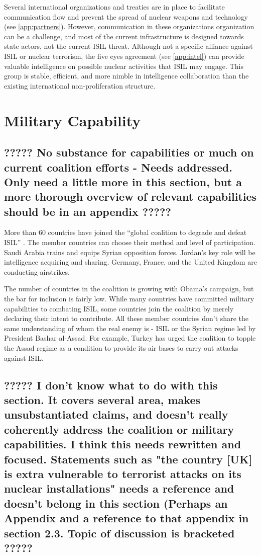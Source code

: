 \documentclass{report}
\begin{document}
Several international organizations and treaties are in place to facilitate communication flow and prevent the spread of nuclear weapons and technology (see \autoref{app:partners}).  However, communication in these organizations organization can be a challenge, and most of the current infrastructure is designed towards state actors, not the current ISIL threat.  Although not a specific alliance against ISIL or nuclear terrorism, the five eyes agreement (see \autoref{app:intel}) can provide valuable intelligence on possible nuclear activities that ISIL may engage. This group is stable, efficient, and more nimble in intelligence collaboration than the existing international non-proliferation structure.  

\section{Military Capability}

\subsection{????? No substance for capabilities or much on current coalition efforts - Needs addressed.  Only need a little more in this section, but a more thorough overview of relevant capabilities should be in an appendix ?????}



More than 60 countries have joined the \enquote{global coalition to degrade and defeat ISIL} \cite{Drennan2014}. The member countries can choose their method and level of participation. Saudi Arabia trains and equips Syrian opposition forces. Jordan's key role will be intelligence acquiring and sharing. Germany, France, and the United Kingdom are conducting airstrikes. 

The number of countries in the coalition is growing with Obama's campaign, but the bar for inclusion is fairly low. While many countries have committed military capabilities to combating ISIL, some countries join the coalition by merely declaring their intent to contribute. All these member countries don't share the same understanding of whom the real enemy is - ISIL or the Syrian regime led by President Bashar al-Assad. For example, Turkey has urged the coalition to topple the Assad regime as a condition to provide its air bases to carry out attacks against ISIL. 

\subsection{????? I don't know what to do with this section.  It covers several area, makes unsubstantiated claims, and doesn't really coherently address the coalition or military capabilities.  I think this needs rewritten and focused.  Statements such as "the country [UK] is extra vulnerable to terrorist attacks on its nuclear installations" needs a reference and doesn't belong in this section (Perhaps an Appendix and a reference to that appendix in section 2.3.  Topic of discussion is bracketed ?????}
\end{document}
